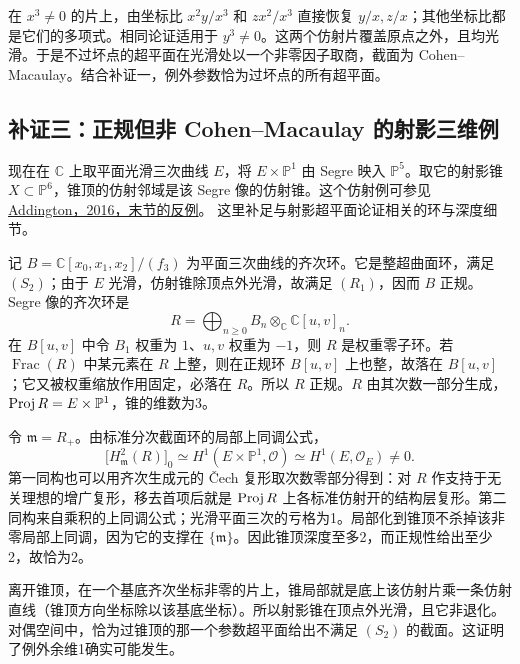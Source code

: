 在 $x^3\ne0$ 的片上，由坐标比 $x^2y/x^3$ 和 $zx^2/x^3$ 直接恢复 $y/x,z/x$；其他坐标比都是它们的多项式。相同论证适用于 $y^3\ne0$。这两个仿射片覆盖原点之外，且均光滑。于是不过坏点的超平面在光滑处以一个非零因子取商，截面为 Cohen--Macaulay。结合补证一，例外参数恰为过坏点的所有超平面。


\subsection*{补证三：正规但非 Cohen--Macaulay 的射影三维例}
现在在 $\mathbb C$ 上取平面光滑三次曲线 $E$，将 $E\times\mathbb P^1$ 由 Segre 映入 $\mathbb P^5$。取它的射影锥 $X\subset\mathbb P^6$，锥顶的仿射邻域是该 Segre 像的仿射锥。这个仿射例可参见
\href{https://content.algebraicgeometry.nl/2016-2/2016-2-011.pdf}{Addington，2016，末节的反例}。
这里补足与射影超平面论证相关的环与深度细节。

记 $B=\mathbb C[x_0,x_1,x_2]/(f_3)$ 为平面三次曲线的齐次环。它是整超曲面环，满足 $(S_2)$；由于 $E$ 光滑，仿射锥除顶点外光滑，故满足 $(R_1)$，因而 $B$ 正规。Segre 像的齐次环是
\[
 R=\bigoplus_{n\ge0}B_n\otimes_{\mathbb C}\mathbb C[u,v]_n .
\]
在 $B[u,v]$ 中令 $B_1$ 权重为 $1$、$u,v$ 权重为 $-1$，则 $R$ 是权重零子环。若 $\operatorname{Frac}(R)$ 中某元素在 $R$ 上整，则在正规环 $B[u,v]$ 上也整，故落在 $B[u,v]$；它又被权重缩放作用固定，必落在 $R$。所以 $R$ 正规。$R$ 由其次数一部分生成，$\Proj R=E\times\mathbb P^1$，锥的维数为3。

令 $\mathfrak m=R_+$。由标准分次截面环的局部上同调公式，
\[
 \bigl[H^2_{\mathfrak m}(R)\bigr]_0
   \simeq H^1(E\times\mathbb P^1,\mathcal O)
   \simeq H^1(E,\mathcal O_E)\ne0 .
\]
第一同构也可以用齐次生成元的 Čech 复形取次数零部分得到：对 $R$ 作支持于无关理想的增广复形，移去首项后就是 $\Proj R$ 上各标准仿射开的结构层复形。第二同构来自乘积的上同调公式；光滑平面三次的亏格为1。局部化到锥顶不杀掉该非零局部上同调，因为它的支撑在 $\{\mathfrak m\}$。因此锥顶深度至多2，而正规性给出至少2，故恰为2。

离开锥顶，在一个基底齐次坐标非零的片上，锥局部就是底上该仿射片乘一条仿射直线（锥顶方向坐标除以该基底坐标）。所以射影锥在顶点外光滑，且它非退化。对偶空间中，恰为过锥顶的那一个参数超平面给出不满足 $(S_2)$ 的截面。这证明了例外余维1确实可能发生。

\endgroup


\hypertarget{D18-102-notes}{}

\begingroup
\def\PP{\mathbb P}\def\OO{\mathcal O}\def\Ocal{\mathcal O}
\def\F{\mathcal F}\def\G{\mathcal G}\def\N{\mathcal N}
\def\PD{\check P}\def\Pdual{\check P}
\def\Ys{Y^{\mathrm{sing}}}\def\Ysing{Y^{\mathrm{sing}}}
\def\Ds{Y^{\mathrm{sup\,sing}}}\def\Ysup{Y^{\mathrm{sup\,sing}}}
\def\cod{\operatorname{codim}}\def\Sing{\operatorname{Sing}}
\def\depth{\operatorname{depth}}\def\coprof{\operatorname{coprof}}
\def\Ass{\operatorname{Ass}}\def\Supp{\operatorname{Supp}}
\def\Gr{\operatorname{Gr}}\def\Spec{\operatorname{Spec}}\def\Proj{\operatorname{Proj}}


